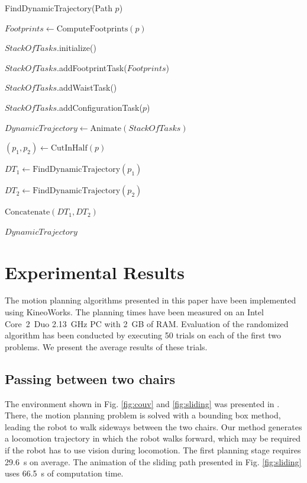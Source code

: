 \documentclass{article}
\begin{document}
\begin{algorithm}[h]
\caption{FindDynamicTrajectory(Path $p$)}
\label{alg:walk}
\begin{algorithmic}
\STATE $Footprints \leftarrow \text{ComputeFootprints}(p)$

\STATE $StackOfTasks$.initialize()

\STATE $StackOfTasks$.addFootprintTask($Footprints$)

\STATE $StackOfTasks$.addWaistTask()

\STATE $StackOfTasks$.addConfigurationTask($p$)

\STATE $DynamicTrajectory \leftarrow \text{Animate}(StackOfTasks)$


\STATE $(p_1,p_2) \leftarrow \text{CutInHalf}(p)$

\STATE $DT_1 \leftarrow \text{FindDynamicTrajectory}(p_1)$

\STATE $DT_2 \leftarrow \text{FindDynamicTrajectory}(p_2)$

\RETURN $\text{Concatenate}(DT_1,DT_2)$

\ELSE

\RETURN $DynamicTrajectory$

\ENDIF
\end{algorithmic}
\end{algorithm}





\section{Experimental Results}

\label{sec:exp}

The motion planning algorithms presented in this paper have been implemented
using KineoWorks\texttrademark \cite{laumond2006kcs}. The planning times have been measured
on an Intel Core~2~Duo 2.13~GHz PC with 2~GB of RAM. Evaluation of the
randomized algorithm has been conducted by executing 50 trials on each
of the first two problems. We present the average results of these trials.



\subsection{Passing between two chairs}

The environment shown in Fig. \ref{fig:couv} and \ref{fig:sliding} was presented
in \cite{el2011path}. There, the motion planning problem is solved with a bounding
box method, leading the robot to walk sideways between the two chairs.
Our method generates a locomotion  trajectory in which the robot walks
forward, which may be required if the robot has to use vision during
locomotion. The first planning stage  requires 29.6~s
on  average.   The  animation  of   the  sliding  path   presented  in
Fig.   \ref{fig:sliding}   uses  66.5~s  of  computation   time.
\end{document}
